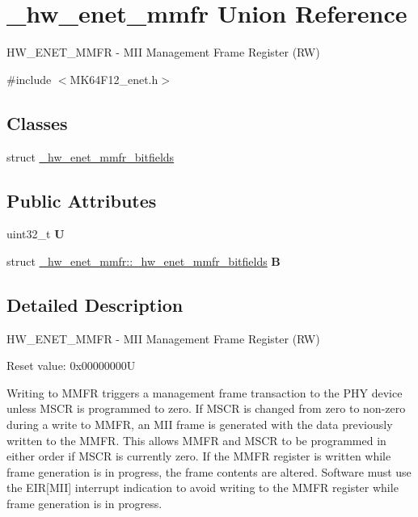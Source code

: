 \hypertarget{union__hw__enet__mmfr}{}\section{\+\_\+hw\+\_\+enet\+\_\+mmfr Union Reference}
\label{union__hw__enet__mmfr}


H\+W\+\_\+\+E\+N\+E\+T\+\_\+\+M\+M\+FR -\/ M\+II Management Frame Register (RW)  




{\ttfamily \#include $<$M\+K64\+F12\+\_\+enet.\+h$>$}

\subsection*{Classes}
\begin{DoxyCompactItemize}
\item 
struct \hyperlink{struct__hw__enet__mmfr_1_1__hw__enet__mmfr__bitfields}{\+\_\+hw\+\_\+enet\+\_\+mmfr\+\_\+bitfields}
\end{DoxyCompactItemize}
\subsection*{Public Attributes}
\begin{DoxyCompactItemize}
\item 
uint32\+\_\+t {\bfseries U}\hypertarget{union__hw__enet__mmfr_a86626a3944738228fdd4c963b881cb7c}{}\label{union__hw__enet__mmfr_a86626a3944738228fdd4c963b881cb7c}

\item 
struct \hyperlink{struct__hw__enet__mmfr_1_1__hw__enet__mmfr__bitfields}{\+\_\+hw\+\_\+enet\+\_\+mmfr\+::\+\_\+hw\+\_\+enet\+\_\+mmfr\+\_\+bitfields} {\bfseries B}\hypertarget{union__hw__enet__mmfr_acc08e9d2183add594d5ba900ae7703ed}{}\label{union__hw__enet__mmfr_acc08e9d2183add594d5ba900ae7703ed}

\end{DoxyCompactItemize}


\subsection{Detailed Description}
H\+W\+\_\+\+E\+N\+E\+T\+\_\+\+M\+M\+FR -\/ M\+II Management Frame Register (RW) 

Reset value\+: 0x00000000U

Writing to M\+M\+FR triggers a management frame transaction to the P\+HY device unless M\+S\+CR is programmed to zero. If M\+S\+CR is changed from zero to non-\/zero during a write to M\+M\+FR, an M\+II frame is generated with the data previously written to the M\+M\+FR. This allows M\+M\+FR and M\+S\+CR to be programmed in either order if M\+S\+CR is currently zero. If the M\+M\+FR register is written while frame generation is in progress, the frame contents are altered. Software must use the E\+IR\mbox{[}M\+II\mbox{]} interrupt indication to avoid writing to the M\+M\+FR register while frame generation is in progress. 

